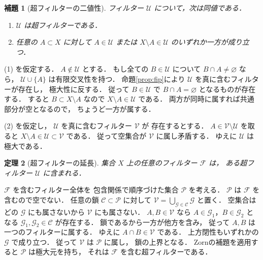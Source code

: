 \documentclass[a5paper,10pt,onecolumn]{jsarticle}
\makeatletter
\theoremstyle{mathnotetheorem}
\newtheorem{theorem}{定理}[section]
\newtheorem{lemma}[theorem]{補題}
\renewcommand{\proofname}{証明}
\renewenvironment{proof}[1][\proofname]{%
  \par\pushQED{\qed}\normalfont\topsep4\p@\@plus2\p@\relax
  \trivlist\item[\hskip\labelsep\bfseries #1]\ignorespaces
}{\popQED\endtrivlist\@endpefalse}
\makeatother
\begin{document}
\begin{lemma}[超フィルターの二値性]\label{lem:ultra-character}
フィルター $\mathcal U$ について，次は同値である．
\begin{enumerate}
\item $\mathcal U$ は超フィルターである．
\item 任意の $A\subset X$ に対して
$A\in\mathcal U$ または
$X\setminus A\in\mathcal U$ のいずれか一方が成り立つ．
\end{enumerate}
\end{lemma}
\begin{proof}
(1) を仮定する．
$A\notin\mathcal U$ とする．
もし全ての $B\in\mathcal U$ について
$B\cap A\ne\varnothing$ なら，
$\mathcal U\cup\{A\}$ は有限交叉性を持つ．
命題\ref{prop:fip}により
$\mathcal U$ を真に含むフィルターが存在し，
極大性に反する．
従って $B\in\mathcal U$ で
$B\cap A=\varnothing$ となるものが存在する．
すると $B\subset X\setminus A$ なので
$X\setminus A\in\mathcal U$ である．
両方が同時に属すれば共通部分が空となるので，
ちょうど一方が属する．

(2) を仮定し，
$\mathcal U$ を真に含むフィルター $\mathcal V$ が
存在するとする．
$A\in\mathcal V\setminus\mathcal U$ を取ると
$X\setminus A\in\mathcal U\subset\mathcal V$ である．
従って空集合が $\mathcal V$ に属し矛盾する．
ゆえに $\mathcal U$ は極大である．
\end{proof}

\begin{theorem}[超フィルターの延長]\label{thm:ultra-extension}
集合 $X$ 上の任意のフィルター $\mathcal F$ は，
ある超フィルター $\mathcal U$ に含まれる．
\end{theorem}
\begin{proof}
$\mathcal F$ を含むフィルター全体を
包含関係で順序づけた集合 $\mathcal P$ を考える．
$\mathcal P$ は $\mathcal F$ を含むので空でない．
任意の鎖 $\mathcal C\subset\mathcal P$ に対して
$\mathcal V=\bigcup_{\mathcal G\in\mathcal C}\mathcal G$
と置く．
空集合はどの $\mathcal G$ にも属さないから
$\mathcal V$ にも属さない．
$A,B\in\mathcal V$ なら
$A\in\mathcal G_1$，$B\in\mathcal G_2$ となる
$\mathcal G_1,\mathcal G_2\in\mathcal C$ が存在する．
鎖であるから一方が他方を含み，
従って $A,B$ は一つのフィルターに属する．
ゆえに $A\cap B\in\mathcal V$ である．
上方閉性もいずれかの $\mathcal G$ で成り立つ．
従って $\mathcal V$ は $\mathcal P$ に属し，
鎖の上界となる．
Zornの補題を適用すると $\mathcal P$ は極大元を持ち，
それは $\mathcal F$ を含む超フィルターである．
\end{proof}
\end{document}
